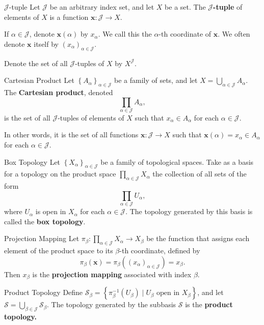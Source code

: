 \documentclass[10pt]{report}
\begin{document}
\begin{defn}{$\mathcal{J}$-tuple}{}
	Let $\mathcal{J}$ be an arbitrary index set, and let $X$ be a set. The \textbf{$\mathcal{J}$-tuple} of elements of $X$ is a function $\mathbf{x}:\mathcal{J}\to X$.

	If $\alpha\in\mathcal{J}$, denote $\mathbf{x}(\alpha)$ by $x_{\alpha}$. We call this the $\alpha$-th coordinate of $\mathbf{x}$. We often denote $\mathbf{x}$ itself by $(x_{\alpha})_{\alpha\in\mathcal{J}}$.

	Denote the set of all $\mathcal{J}$-tuples of $X$ by $X^{\mathcal{J}}$.
\end{defn}

\begin{defn}{Cartesian Product}{}
Let $\left\{ A_{\alpha} \right\}_{\alpha\in\mathcal{J}}$ be a family of sets, and let $X = \bigcup_{\alpha\in\mathcal{J}}A_{\alpha}$. The \textbf{Cartesian product}, denoted
\[
\prod_{\alpha\in\mathcal{J}}A_{\alpha},
\] is the set of all $\mathcal{J}$-tuples of elements of $X$ such that $x_\alpha \in A_{\alpha}$ for each $\alpha\in\mathcal{J}$.

In other words, it is the set of all functions $\mathbf{x}:\mathcal{J}\to X$ such that $\mathbf{x}(\alpha)=x_{\alpha}\in A_{\alpha}$ for each $\alpha\in\mathcal{J}$.
\end{defn}

\begin{defn}{Box Topology}{}
Let $\left\{ X_{\alpha} \right\}_{\alpha\in\mathcal{J}}$ be a family of topological spaces. Take as a basis for a topology on the product space $\prod_{\alpha\in\mathcal{J}}X_{\alpha}$ the collection of all sets of the form
\[
\prod_{\alpha\in\mathcal{J}}U_{\alpha},
\] where $U_{\alpha}$ is open in $X_{\alpha}$ for each $\alpha\in\mathcal{J}$. The topology generated by this basis is called the \textbf{box topology}.
\end{defn}

\begin{defn}{Projection Mapping}{}
Let $\pi_{\beta}:\prod_{\alpha\in\mathcal{J}}X_{\alpha}\to X_{\beta}$ be the function that assigns each element of the product space to its $\beta$-th coordinate, defined by
\[
	\pi_{\beta}(\mathbf{x}) = \pi_{\beta}( (x_{\alpha})_{\alpha\in\mathcal{J}}) = x_{\beta}.
\] Then $x_{\beta}$ is the \textbf{projection mapping} associated with index $\beta$.
\end{defn}

\begin{defn}{Product Topology}{}
	Define $\mathcal{S}_{\beta} = \left\{ \pi_{\beta}^{-1}(U_{\beta}) \;|\; U_{\beta} \text{ open in } X_{\beta} \right\}$, and let $\mathcal{S} = \bigcup_{\beta\in\mathcal{J}} \mathcal{S}_{\beta}$. The topology generated by the subbasis $\mathcal{S}$ is the \textbf{product topology.} 
\end{defn}
\end{document}
